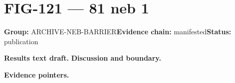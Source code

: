 \clearpage
\section{FIG-121 --- 81 neb 1}
\label{figpage:fig-121}
\textbf{Group:} ARCHIVE-NEB-BARRIER\quad \textbf{Evidence chain:} manifested\quad \textbf{Status:} publication

\textbf{Results text draft.} 
\textbf{Discussion and boundary.} 


\textbf{Evidence pointers.}



\vfill
